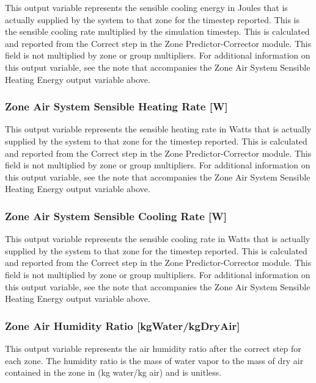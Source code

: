 This output variable represents the sensible cooling energy in Joules that is actually supplied by the system to that zone for the timestep reported. This is the sensible cooling rate multiplied by the simulation timestep. This is calculated and reported from the Correct step in the Zone Predictor-Corrector module. This field is not multiplied by zone or group multipliers. For additional information on this output variable, see the note that accompanies the Zone Air System Sensible Heating Energy output variable above.

\subsubsection{Zone Air System Sensible Heating Rate {[}W{]}}\label{zone-air-system-sensible-heating-rate-w}

This output variable represents the sensible heating rate in Watts that is actually supplied by the system to that zone for the timestep reported. This is calculated and reported from the Correct step in the Zone Predictor-Corrector module. This field is not multiplied by zone or group multipliers. For additional information on this output variable, see the note that accompanies the Zone Air System Sensible Heating Energy output variable above.

\subsubsection{Zone Air System Sensible Cooling Rate {[}W{]}}\label{zone-air-system-sensible-cooling-rate-w}

This output variable represents the sensible cooling rate in Watts that is actually supplied by the system to that zone for the timestep reported. This is calculated and reported from the Correct step in the Zone Predictor-Corrector module. This field is not multiplied by zone or group multipliers. For additional information on this output variable, see the note that accompanies the Zone Air System Sensible Heating Energy output variable above.

\subsubsection{Zone Air Humidity Ratio {[}kgWater/kgDryAir{]}}\label{zone-air-humidity-ratio-kgwaterkgdryair}

This output variable represents the air humidity ratio after the correct step for each zone. The humidity ratio is the mass of water vapor to the mass of dry air contained in the zone in (kg water/kg air) and is unitless.

